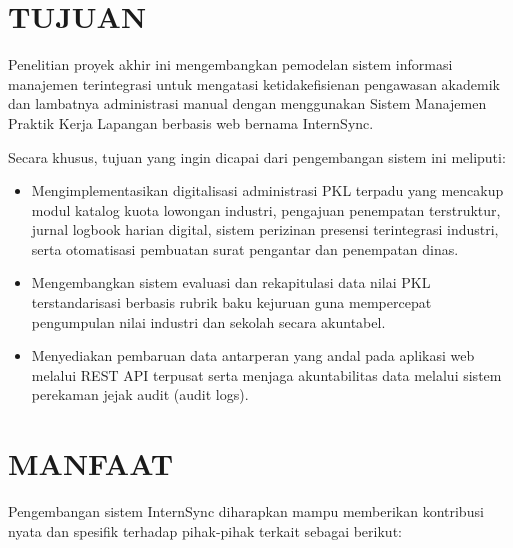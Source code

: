 \section{TUJUAN}

Penelitian proyek akhir ini mengembangkan pemodelan sistem informasi manajemen terintegrasi untuk mengatasi ketidakefisienan pengawasan akademik dan lambatnya administrasi manual dengan menggunakan Sistem Manajemen Praktik Kerja Lapangan berbasis web bernama InternSync.

Secara khusus, tujuan yang ingin dicapai dari pengembangan sistem ini meliputi:

\begin{itemize}
\item Mengimplementasikan digitalisasi administrasi PKL terpadu yang mencakup modul katalog kuota lowongan industri, pengajuan penempatan terstruktur, jurnal logbook harian digital, sistem perizinan presensi terintegrasi industri, serta otomatisasi pembuatan surat pengantar dan penempatan dinas.
\item Mengembangkan sistem evaluasi dan rekapitulasi data nilai PKL terstandarisasi berbasis rubrik baku kejuruan guna mempercepat pengumpulan nilai industri dan sekolah secara akuntabel.
\item Menyediakan pembaruan data antarperan yang andal pada aplikasi web melalui REST API terpusat serta menjaga akuntabilitas data melalui sistem perekaman jejak audit (audit logs).
\end{itemize}

\section{MANFAAT}

Pengembangan sistem InternSync diharapkan mampu memberikan kontribusi nyata dan spesifik terhadap pihak-pihak terkait sebagai berikut:

